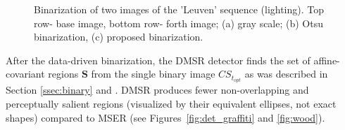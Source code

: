 \documentclass{article}
\def\S{{\mathbf S}}
\begin{document}
\begin{figure}[htb]
 \vspace{-0.5cm}
\caption{Binarization of two images of the 'Leuven' sequence (lighting). Top row- base image, bottom row- forth image;   (a) gray scale; (b) Otsu binarization, (c) proposed binarization.}
\label{fig:leuven_bin}
%
\end{figure}

After the data-driven binarization, the DMSR detector finds the set of affine-covariant regions $\S$ from the single binary image $CS_{t_{opt}}$ as was described in Section \ref{ssec:binary} and \cite{RangMSSR06, RangHumpb06}. DMSR produces fewer non-overlapping and perceptually salient regions (visualized by their equivalent ellipses, not exact shapes) compared to MSER (see Figures~\ref{fig:det_graffiti} and \ref{fig:wood}).
\end{document}
